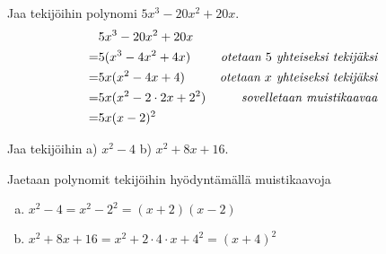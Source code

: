 \begin{esimerkki}
Jaa tekijöihin polynomi $5x^3-20x^2+20x$.
\begin{align*}
& 5x^3-20x^2+20x \\
=& 5(x^3-4x^2+4x) \ \ \ \ &\emph{otetaan $5$ yhteiseksi tekijäksi} \\
=& 5x(x^2-4x+4) &\emph{otetaan $x$ yhteiseksi tekijäksi} \\
=& 5x(x^2-2\cdot 2x+2^2) &\emph{sovelletaan muistikaavaa} \\
=& 5x(x-2)^2
\end{align*}
\end{esimerkki}

\begin{esimerkki}
Jaa tekijöihin \quad a) $x^2-4$ \quad b) $x^2+8x+16.$

Jaetaan polynomit tekijöihin hyödyntämällä muistikaavoja
\begin{enumerate}[a)]
    \item $x^2-4 = x^2-2^2 = (x+2)(x-2)$
    \item $x^2+8x+16 = x^2+ 2\cdot 4 \cdot x + 4^2 = (x+4)^2$
\end{enumerate}
\end{esimerkki}


